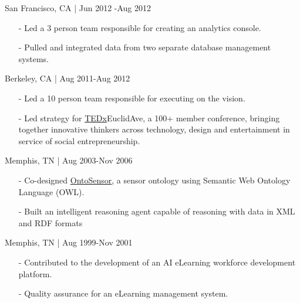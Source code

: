 \documentclass[11pt,article,oneside]{memoir}
\begin{document}
 \hfill San Francisco, CA | Jun 2012 -Aug 2012
\begin{itemize}[nolistsep]
\item[-]Led a 3 person team responsible for creating an analytics console.
\item[-]Pulled and integrated data from two separate database management systems.
\end{itemize} 

 \hfill Berkeley, CA | Aug 2011-Aug 2012
\begin{itemize}[noitemsep,nolistsep]
\item[-]Led a 10 person team responsible for executing on the vision.
\item[-]Led strategy for \href{http://www.ted.com/tedx/events/3790}{TEDx}EuclidAve, a 100+ member conference, bringing together innovative thinkers across technology, design and entertainment in service of social entrepreneurship.
\end{itemize}

 \hfill Memphis, TN | Aug 2003-Nov 2006
\begin{itemize}[nolistsep]
\item[-]Co-designed \href{https://scholar.google.com/scholar?hl=en&q=Building+a+Sensor+Ontology\%3A+A+Practical+Approach+Leveraging+ISO+and+OGC+Models.&btnG=&as_sdt=1\%2C43&as_sdtp=}{OntoSensor}, a sensor ontology using Semantic Web Ontology Language (OWL).
\item[-]Built an intelligent reasoning agent capable of reasoning with data in XML and RDF formats
\end{itemize}

 \hfill Memphis, TN | Aug 1999-Nov 2001
\begin{itemize}[nolistsep]
\item[-]Contributed to the development of an AI eLearning workforce development platform.
\item[-]Quality assurance for an eLearning management system.
\end{itemize} 

\bigskip

\medskip
\end{document}
